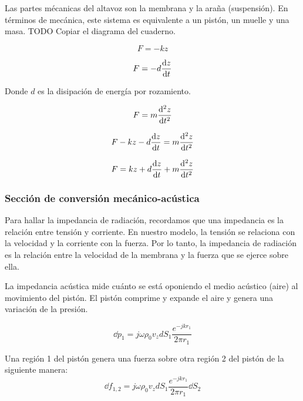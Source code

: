 \documentclass[12pt, a4paper]{article}
\begin{document}
Las partes mécanicas del altavoz son la membrana y la araña (suspensión). En términos de mecánica, este sistema es equivalente a un pistón, un muelle y una masa. TODO Copiar el diagrama del cuaderno.

\begin{equation} \label{eq:ley_hooke}
  F = -kz
\end{equation}

\begin{equation} \label{eq:amortiguamiento}
  F = -d \dv{z}{t}
\end{equation}

Donde $d$ es la disipación de energía por rozamiento.

\begin{equation} \label{eq:masa}
  F = m \dv[2]{z}{t}
\end{equation}

\begin{equation} \label{eq:ecuacion_seccion_mecanica}
  F - k z - d \dv{z}{t} = m \dv[2]{z}{t}
\end{equation}

\begin{equation} \label{eq:ecuacion_seccion_mecanica_2}
  F = kz + d \dv{z}{t} + m \dv[2]{z}{t}
\end{equation}

\subsubsection{Sección de conversión mecánico-acústica}

Para hallar la impedancia de radiación, recordamos que una impedancia es la relación entre tensión y corriente. En nuestro modelo, la tensión se relaciona con la velocidad y la corriente con la fuerza. Por lo tanto, la impedancia de radiación es la relación entre la velocidad de la membrana y la fuerza que se ejerce sobre ella.

La impedancia acústica mide cuánto se está oponiendo el medio acústico (aire) al movimiento del pistón. El pistón comprime y expande el aire y genera una variación de la presión.

\begin{equation} \label{eq:incremento_presion}
  \dd p_1 = j\omega\rho_0 v_z d S_1 \frac{e^{-jkr_1}}{2\pi r_1}
\end{equation}

Una región 1 del pistón genera una fuerza sobre otra región 2 del pistón de la siguiente manera:
\begin{equation} \label{eq:presion_de_1_sobre_2}
  \dd f_{1,2} = j\omega \rho_0 v_z d S_1 \frac{e^{-jkr_1}}{2\pi r_1} \dd S_2
\end{equation}
\end{document}
